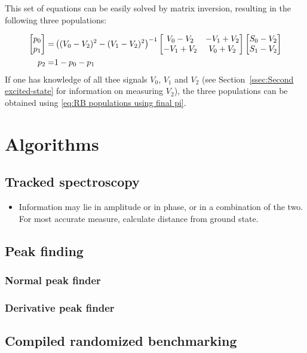     This set of equations can be easily solved by matrix inversion, resulting in the following three populations:

    \begin{align}
      \begin{bmatrix}
        p_0 \\
        p_1
      \end{bmatrix}
      = &
      \left((V_0-V_2)^2 - (V_1 - V_2)^2\right)^{-1}
      \begin{bmatrix}
        V_0 - V_2 & -V_1 + V_2 \\
        -V_1 + V_2 & V_0 + V_2
      \end{bmatrix}
      \begin{bmatrix}
        S_0 - V_2 \\
        S_1 - V_2
      \end{bmatrix} \notag\\
      p_2 = & 1 - p_0 - p_1
      \label{eq:RB populations using final pi}
    \end{align}
    If one has knowledge of all thee signals $V_0$, $V_1$ and $V_2$ (see Section~\ref{ssec:Second excited-state} for information on measuring $V_2$), the three populations can be obtained using \ref{eq:RB populations using final pi}.

\chapter{Algorithms}
\section{Tracked spectroscopy}
\label{sec:Tracked spectroscopy}
  \begin{itemize}
    \item Information may lie in amplitude or in phase, or in a combination of the two. For most accurate measure, calculate distance from ground state.
  \end{itemize}
\section{Peak finding}
  \subsection{Normal peak finder}
  \subsection{Derivative peak finder}
\section{Compiled randomized benchmarking}
  \label{sec:compiled randomized benchmarking algorithm}